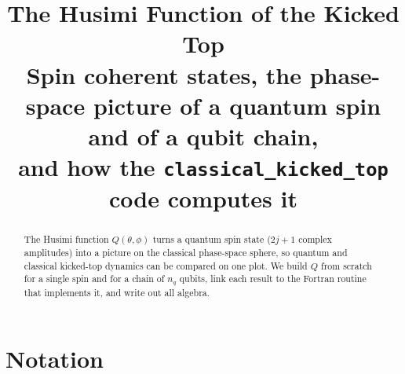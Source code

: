 \documentclass[11pt,a4paper]{article}
\title{The Husimi Function of the Kicked Top\\[0.3em]
  \large Spin coherent states, the phase-space picture of a quantum spin and of a qubit chain,\\
  and how the \texttt{classical\_kicked\_top} code computes it}
\author{}
\date{}
\begin{document}
\maketitle

\begin{abstract}
The Husimi function $Q(\theta,\phi)$ turns a quantum spin state ($2j+1$ complex amplitudes) into a picture on the
classical phase-space sphere, so quantum and classical kicked-top dynamics can be compared on one plot. We build $Q$
from scratch for a single spin and for a chain of $n_q$ qubits, link each result to the Fortran routine that
implements it, and write out all algebra.
\end{abstract}

{\setcounter{tocdepth}{1}\tableofcontents}

\section*{Notation}
\end{document}
